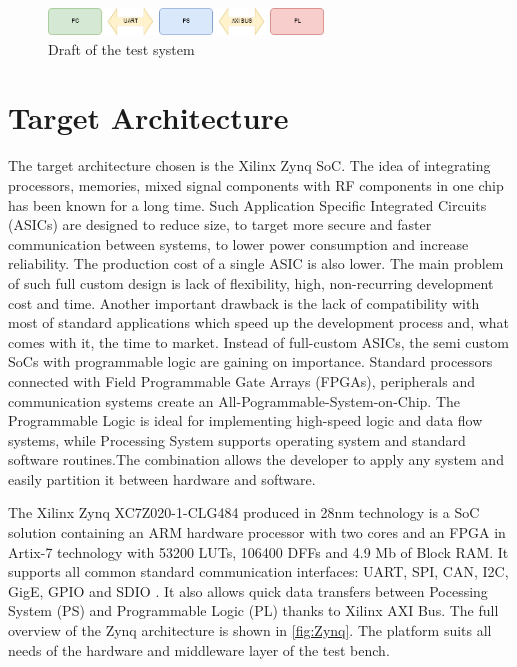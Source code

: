 \begin{figure}[H]
\centering
\includegraphics[width=0.65\textwidth]{figures/PCPSPL.png}
\caption{Draft of the test system}
\label{fig:draft}
\end{figure}

\section {Target Architecture}
The target architecture chosen is the Xilinx Zynq SoC. The idea of integrating processors, memories, mixed signal components with RF components in one chip has been known for a long time. Such Application Specific Integrated Circuits (ASICs) are designed to reduce size, to target more secure and faster communication between systems, to lower power consumption and increase reliability. The production cost of a single ASIC is also lower. The main problem of such full custom design is lack of flexibility, high, non-recurring development cost and time. Another important drawback is the lack of compatibility with most of standard applications which speed up the development process and, what comes with it, the time to market. Instead of full-custom ASICs, the semi custom SoCs with programmable logic are gaining on importance. Standard processors connected with Field Programmable Gate Arrays (FPGAs), peripherals and communication systems create an All-Pogrammable-System-on-Chip. The Programmable Logic is ideal for implementing high-speed logic and data flow systems, while Processing System supports operating system and standard software routines.The combination allows the developer to apply any system and easily partition it between hardware and software.

The Xilinx Zynq XC7Z020-1-CLG484 produced in 28nm technology is a SoC solution containing an ARM hardware processor with two cores and an FPGA in Artix-7 technology with 53200 LUTs, 106400 DFFs and 4.9 Mb of Block RAM. It supports all common standard communication interfaces: UART, SPI, CAN, I2C, GigE, GPIO and SDIO . It also allows quick data transfers between Pocessing System (PS) and Programmable Logic (PL) thanks to Xilinx AXI Bus. The full overview of the Zynq architecture is shown in \autoref{fig:Zynq}. The platform suits all needs of the hardware and middleware layer of the test bench.

